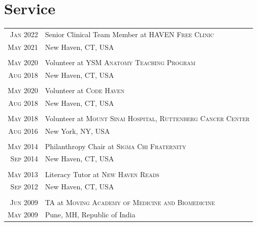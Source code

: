 \documentclass[a4paper,10pt]{article}
\begin{document}
\section{Service}
\begin{longtable}{r|p{11cm}}
 \nopagebreak \textsc{Jan 2022} & Senior Clinical Team Member at \textsc{HAVEN Free Clinic}\\
 \nopagebreak \textsc{May 2021} &  \small{New Haven, CT, USA}\\
 \multicolumn{2}{c}{} \\
 \nopagebreak \textsc{May 2020} & Volunteer at \textsc{YSM Anatomy Teaching Program} \\
 \nopagebreak \textsc{Aug 2018} &  \small{New Haven, CT, USA}\\
 \multicolumn{2}{c}{} \\
  \nopagebreak \textsc{May 2020} & Volunteer at \textsc{Code Haven} \\
 \nopagebreak \textsc{Aug 2018} &  \small{New Haven, CT, USA}\\
 \multicolumn{2}{c}{} \\
 \nopagebreak \textsc{May 2018} & Volunteer at \textsc{Mount Sinai Hospital, Ruttenberg Cancer Center} \\
 \nopagebreak \textsc{Aug 2016} &  \small{New York, NY, USA}\\
 \multicolumn{2}{c}{} \\
 \nopagebreak \textsc{May 2014} & Philanthropy Chair at \textsc{Sigma Chi Fraternity}\\
 \nopagebreak \textsc{Sep 2014} & \small{New Haven, CT, USA} \\
 \multicolumn{2}{c}{} \\
 \nopagebreak \textsc{May 2013} & Literacy Tutor at \textsc{New Haven Reads}\\
 \nopagebreak \textsc{Sep 2012} & \small{New Haven, CT, USA} \\
 \multicolumn{2}{c}{} \\
 \nopagebreak \textsc{Jun 2009} & TA at \textsc{Moving Academy of Medicine and Biomedicine} \\
 \nopagebreak \textsc{May 2009} & \small{Pune, MH, Republic of India} \\
\end{longtable}

\newpage
\end{document}
